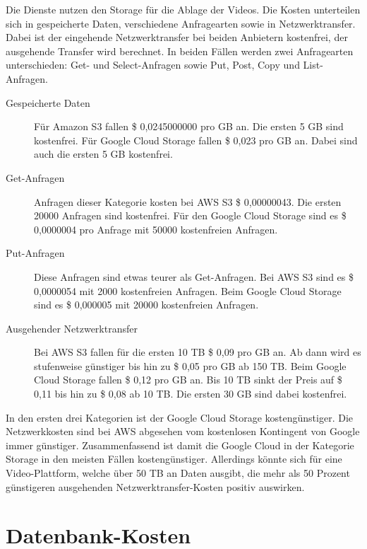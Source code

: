 Die Dienste nutzen den Storage für die Ablage der Videos. Die Kosten unterteilen sich in gespeicherte Daten, verschiedene Anfragearten sowie in Netzwerktransfer. Dabei ist der eingehende Netzwerktransfer bei beiden Anbietern kostenfrei, der ausgehende Transfer wird berechnet. In beiden Fällen werden zwei Anfragearten unterschieden: Get- und Select-Anfragen sowie Put, Post, Copy und List-Anfragen.

\begin{description}
  \item[Gespeicherte Daten] Für Amazon S3 fallen \$ 0,0245000000 pro GB an. Die ersten 5 GB sind kostenfrei. Für Google Cloud Storage fallen \$ 0,023 pro GB an. Dabei sind auch die ersten 5 GB kostenfrei.
  \item[Get-Anfragen] Anfragen dieser Kategorie kosten bei \ac{AWS} S3 \$ 0,00000043. Die ersten 20000 Anfragen sind kostenfrei. Für den Google Cloud Storage sind es \$ 0,0000004 pro Anfrage mit 50000 kostenfreien Anfragen.
  \item[Put-Anfragen] Diese Anfragen sind etwas teurer als Get-Anfragen. Bei \ac{AWS} S3 sind es \$ 0,0000054 mit 2000 kostenfreien Anfragen. Beim Google Cloud Storage sind es \$ 0,000005 mit 20000 kostenfreien Anfragen.
  \item[Ausgehender Netzwerktransfer] Bei \ac{AWS} S3 fallen für die ersten 10 TB \$ 0,09 pro GB an. Ab dann wird es stufenweise günstiger bis hin zu \$ 0,05 pro GB ab 150 TB. Beim Google Cloud Storage fallen \$ 0,12 pro GB an. Bis 10 TB sinkt der Preis auf \$ 0,11 bis hin zu \$ 0,08 ab 10 TB. Die ersten 30 GB sind dabei kostenfrei.
\end{description}

In den ersten drei Kategorien ist der Google Cloud Storage kostengünstiger. Die Netzwerkkosten sind bei \ac{AWS} abgesehen vom kostenlosen Kontingent von Google immer günstiger. Zusammenfassend ist damit die Google Cloud in der Kategorie Storage in den meisten Fällen kostengünstiger. Allerdings könnte sich für eine Video-Plattform, welche über 50 TB an Daten ausgibt, die mehr als 50 Prozent günstigeren ausgehenden Netzwerktransfer-Kosten positiv auswirken.

\section{Datenbank-Kosten}

